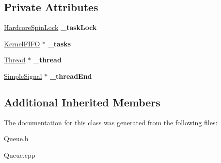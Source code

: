 \subsection*{Private Attributes}
\begin{DoxyCompactItemize}
\item 
\mbox{\label{class_dispatch_queue_abf8f4141259cb1332d778755db309a8d}} 
\hyperlink{class_hardcore_spin_lock}{Hardcore\+Spin\+Lock} {\bfseries \+\_\+task\+Lock}
\item 
\mbox{\label{class_dispatch_queue_ab9d2b9ec0351036442b556382b9a21bf}} 
\hyperlink{class_kernel_f_i_f_o}{Kernel\+F\+I\+FO} $\ast$ {\bfseries \+\_\+tasks}
\item 
\mbox{\label{class_dispatch_queue_a2ff299d7672007208eaa503d0cc32a70}} 
\hyperlink{class_thread}{Thread} $\ast$ {\bfseries \+\_\+thread}
\item 
\mbox{\label{class_dispatch_queue_a157e71179befc0648ecd99c30a48fce9}} 
\hyperlink{class_simple_signal}{Simple\+Signal} $\ast$ {\bfseries \+\_\+thread\+End}
\end{DoxyCompactItemize}
\subsection*{Additional Inherited Members}


The documentation for this class was generated from the following files\+:\begin{DoxyCompactItemize}
\item 
Queue.\+h\item 
Queue.\+cpp\end{DoxyCompactItemize}
